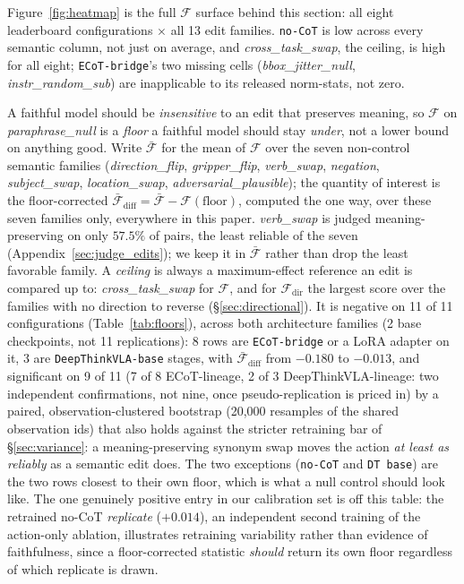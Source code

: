 \documentclass{article}
\begin{document}
Figure~\ref{fig:heatmap} is the full $\mathcal{F}$ surface behind this section: all eight leaderboard configurations $\times$ all 13 edit families. \texttt{no-CoT} is low across every semantic column, not just on average, and \emph{cross\_task\_swap}, the ceiling, is high for all eight; \texttt{ECoT-bridge}'s two missing cells (\emph{bbox\_jitter\_null}, \emph{instr\_random\_sub}) are inapplicable to its released norm-stats, not zero.

A faithful model should be \emph{insensitive} to an edit that preserves meaning, so $\mathcal{F}$ on \emph{paraphrase\_null} is a \emph{floor} a faithful model should stay \emph{under}, not a lower bound on anything good. Write $\bar{\mathcal{F}}$ for the mean of $\mathcal{F}$ over the seven non-control semantic families (\emph{direction\_flip}, \emph{gripper\_flip}, \emph{verb\_swap}, \emph{negation}, \emph{subject\_swap}, \emph{location\_swap}, \emph{adversarial\_plausible}); the quantity of interest is the floor-corrected $\bar{\mathcal{F}}_{\text{diff}} = \bar{\mathcal{F}} - \mathcal{F}(\text{floor})$, computed the one way, over these seven families only, everywhere in this paper. \emph{verb\_swap} is judged meaning-preserving on only $57.5\%$ of pairs, the least reliable of the seven (Appendix~\ref{sec:judge_edits}); we keep it in $\bar{\mathcal{F}}$ rather than drop the least favorable family. A \emph{ceiling} is always a maximum-effect reference an edit is compared up to: \emph{cross\_task\_swap} for $\mathcal{F}$, and for $\mathcal{F}_{\text{dir}}$ the largest score over the families with no direction to reverse (\S\ref{sec:directional}).
It is negative on 11 of 11 configurations (Table~\ref{tab:floors}), across both architecture families (2 base checkpoints, not 11 replications): 8 rows are \texttt{ECoT-bridge} or a LoRA adapter on it, 3 are \texttt{DeepThinkVLA-base} stages, with $\bar{\mathcal{F}}_{\text{diff}}$ from $-0.180$ to $-0.013$, and significant on 9 of 11 (7 of 8 ECoT-lineage, 2 of 3 DeepThinkVLA-lineage: two independent confirmations, not nine, once pseudo-replication is priced in) by a paired, observation-clustered bootstrap (20,000 resamples of the shared observation ids) that also holds against the stricter retraining bar of \S\ref{sec:variance}: a meaning-preserving synonym swap moves the action \emph{at least as reliably} as a semantic edit does. The two exceptions (\texttt{no-CoT} and \texttt{DT base}) are the two rows closest to their own floor, which is what a null control should look like. The one genuinely positive entry in our calibration set is off this table: the retrained no-CoT \emph{replicate} ($+0.014$), an independent second training of the action-only ablation, illustrates retraining variability rather than evidence of faithfulness, since a floor-corrected statistic \emph{should} return its own floor regardless of which replicate is drawn.
\end{document}
